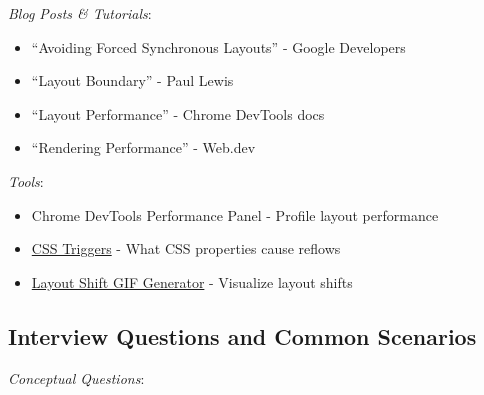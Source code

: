 \documentclass[11pt]{article}
\begin{document}
\emph{Blog Posts \& Tutorials}:

\begin{itemize}
\item ``Avoiding Forced Synchronous Layouts'' - Google Developers
\item ``Layout Boundary'' - Paul Lewis
\item ``Layout Performance'' - Chrome DevTools docs
\item ``Rendering Performance'' - Web.dev
\end{itemize}

\emph{Tools}:

\begin{itemize}
\item Chrome DevTools Performance Panel - Profile layout performance
\item \href{https://csstriggers.com/}{CSS Triggers} - What CSS properties cause reflows
\item \href{https://defaced.dev/tools/layout-shift-gif-generator/}{Layout Shift GIF Generator} - Visualize layout shifts
\end{itemize}
\subsection{Interview Questions and Common Scenarios}
\label{sec:org20efd8f}

\emph{Conceptual Questions}:
\end{document}
